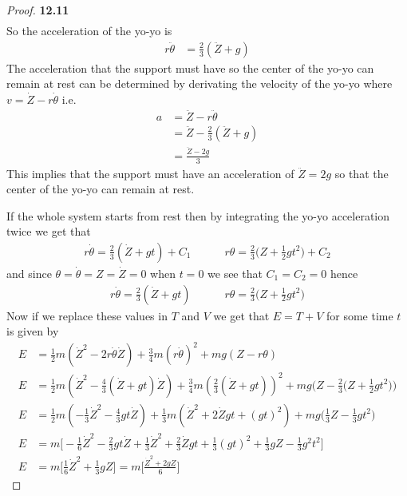 \documentclass[11pt]{article}
\theoremstyle{definition}
\begin{document}
\begin{proof}{\textbf{12.11}}
\begin{align*}
    \end{align*}
    So the acceleration of the yo-yo is
    \begin{align*}
        r\ddot{\theta} &= \frac{2}{3}(\ddot{Z} + g)
    \end{align*}
    The acceleration that the support must have so the center of the
    yo-yo can remain at rest can be determined by derivating the velocity of
    the yo-yo where $v = \dot{Z} - r \dot{\theta}$ i.e. 
    \begin{align*}
        a &= \ddot{Z} - r\ddot{\theta}\\
        &= \ddot{Z} - \frac{2}{3}(\ddot{Z} + g)\\
        &= \frac{\ddot{Z} - 2g}{3}
    \end{align*}
    This implies that the support must have an acceleration of $\ddot{Z} = 2g$
    so that the center of the yo-yo can remain at rest.
    
    If the whole system starts from rest then by integrating the yo-yo
    acceleration twice we get that
    \begin{align*}
        r\dot\theta = \frac{2}{3}(\dot{Z} + gt) + C_1
        \quad\quad\quad
        r\theta = \frac{2}{3}\bigg(Z + \frac{1}{2}gt^2\bigg) + C_2
    \end{align*}
    and since $\theta = \dot\theta = Z = \dot{Z} = 0$ when $t=0$ we see that
    $C_1 = C_2 = 0$ hence
    \begin{align*}
        r\dot\theta = \frac{2}{3}(\dot{Z} + gt)
        \quad\quad\quad
        r\theta = \frac{2}{3}\bigg(Z + \frac{1}{2}gt^2\bigg)
    \end{align*}
    Now if we replace these values in $T$ and $V$ we get that $E = T + V$ for
    some time $t$ is given by
    \begin{align*}
        E &= \frac{1}{2}m(\dot{Z}^2 - 2r\dot{\theta}\dot{Z})
        + \frac{3}{4}m(r\dot{\theta})^2 + mg(Z - r\theta)\\
        E &= \frac{1}{2}m(\dot{Z}^2 - \frac{4}{3}(\dot{Z} + gt)\dot{Z})
        + \frac{3}{4}m(\frac{2}{3}(\dot{Z} + gt))^2
        + mg\bigg(Z - \frac{2}{3}\bigg(Z + \frac{1}{2}gt^2\bigg)\bigg)\\
        E &= \frac{1}{2}m(-\frac{1}{3}\dot{Z}^2 - \frac{4}{3}gt\dot{Z})
        + \frac{1}{3}m(\dot{Z}^2 + 2\dot{Z}gt + (gt)^2)
        + mg\bigg(\frac{1}{3}Z - \frac{1}{3}gt^2\bigg)\\
        E &= m\bigg[-\frac{1}{6}\dot{Z}^2 - \frac{2}{3}gt\dot{Z}
        + \frac{1}{3}\dot{Z}^2 + \frac{2}{3}\dot{Z}gt + \frac{1}{3}(gt)^2
        + \frac{1}{3}gZ - \frac{1}{3}g^2t^2\bigg]\\
        E &= m\bigg[\frac{1}{6}\dot{Z}^2
        + \frac{1}{3}gZ\bigg] = m \bigg[\frac{\dot{Z}^2 + 2gZ}{6}\bigg]
    \end{align*}
\end{proof}
\end{document}
